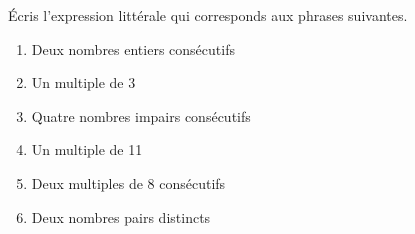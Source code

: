 %
%
  Écris l'expression littérale qui corresponds aux phrases suivantes.
  \begin{enumerate}[cols=2]
    \item Deux nombres entiers consécutifs
    \item Un multiple de $3$
    \item Quatre nombres impairs consécutifs
    \item Un multiple de 11
    \item Deux multiples de 8 consécutifs
    \item Deux nombres pairs distincts
  \end{enumerate}
